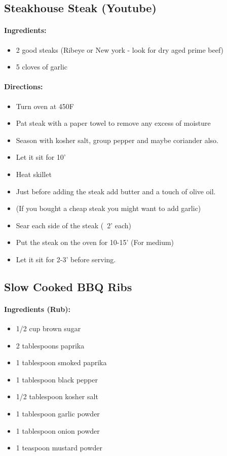 \documentclass{article}
\begin{document}
\subsection{Steakhouse Steak (Youtube)}

\paragraph{Ingredients:}
\begin{itemize}
    \item 2 good steaks (Ribeye or New york - look for dry aged prime beef)
    \item 5 cloves of garlic
\end{itemize}

\paragraph{Directions:}
\begin{itemize}
    \item Turn oven at 450F
    \item Pat steak with a paper towel to remove any excess of moisture
    \item Season with kosher salt, group pepper and maybe coriander also.
    \item Let it sit for 10'
    \item Heat skillet
    \item Just before adding the steak add butter and a touch of olive oil.
    \item (If you bought a cheap steak you might want to add garlic)
    \item Sear each side of the steak (~2' each)
    \item Put the steak on the oven for 10-15' (For medium)
    \item Let it sit for 2-3' before serving.
\end{itemize}

\subsection{Slow Cooked BBQ Ribs} 

\paragraph{Ingredients (Rub):}
\begin{itemize}
    \item 1/2 cup brown sugar
    \item 2 tablespoons paprika
    \item 1 tablespoon smoked paprika
    \item 1 tablespoon black pepper
    \item 1/2 tablespoon kosher salt
    \item 1 tablespoon garlic powder
    \item 1 tablespoon onion powder
    \item 1 teaspoon mustard powder
\end{itemize}  
\end{document}
